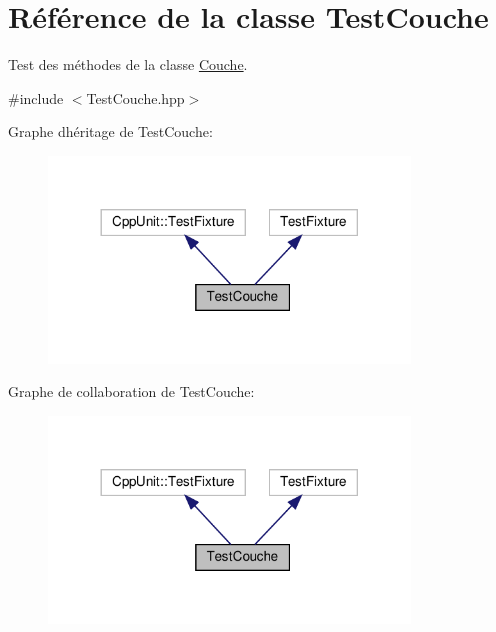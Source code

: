 \hypertarget{classTestCouche}{}\section{Référence de la classe Test\+Couche}
\label{classTestCouche}


Test des méthodes de la classe \hyperlink{classCouche}{Couche}.  




{\ttfamily \#include $<$Test\+Couche.\+hpp$>$}



Graphe d\textquotesingle{}héritage de Test\+Couche\+:
\nopagebreak
\begin{figure}[H]
\begin{center}
\leavevmode
\includegraphics[width=272pt]{classTestCouche__inherit__graph}
\end{center}
\end{figure}


Graphe de collaboration de Test\+Couche\+:
\nopagebreak
\begin{figure}[H]
\begin{center}
\leavevmode
\includegraphics[width=272pt]{classTestCouche__coll__graph}
\end{center}
\end{figure}
